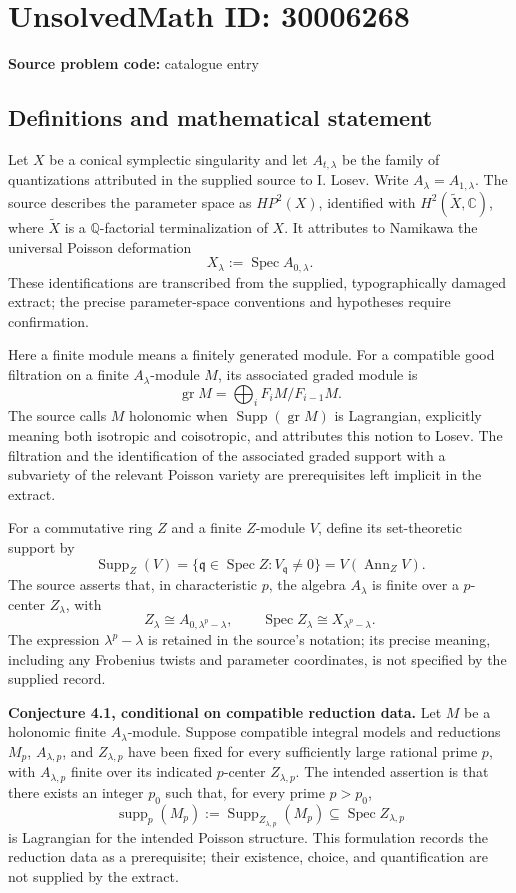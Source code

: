 \documentclass[11pt]{article}
\newcommand{\Q}{\mathbb{Q}}
\newcommand{\C}{\mathbb{C}}
\begin{document}
\section*{UnsolvedMath ID: 30006268}
\textbf{Source problem code:} catalogue entry
\subsection{Definitions and mathematical statement}
Let \(X\) be a conical symplectic singularity and let \(A_{t,\lambda}\) be the family of quantizations attributed in the supplied source to I. Losev. Write \(A_\lambda=A_{1,\lambda}\). The source describes the parameter space as \(HP^2(X)\), identified with \(H^2(\widetilde X,\C)\), where \(\widetilde X\) is a \(\Q\)-factorial terminalization of \(X\). It attributes to Namikawa the universal Poisson deformation
\[
X_\lambda:=\operatorname{Spec}A_{0,\lambda}.
\]
These identifications are transcribed from the supplied, typographically damaged extract; the precise parameter-space conventions and hypotheses require confirmation.

Here a finite module means a finitely generated module. For a compatible good filtration on a finite \(A_\lambda\)-module \(M\), its associated graded module is
\[
\operatorname{gr}M=\bigoplus_i F_iM/F_{i-1}M.
\]
The source calls \(M\) holonomic when \(\operatorname{Supp}(\operatorname{gr}M)\) is Lagrangian, explicitly meaning both isotropic and coisotropic, and attributes this notion to Losev. The filtration and the identification of the associated graded support with a subvariety of the relevant Poisson variety are prerequisites left implicit in the extract.

For a commutative ring \(Z\) and a finite \(Z\)-module \(V\), define its set-theoretic support by
\[
\operatorname{Supp}_Z(V)
=\{\mathfrak q\in\operatorname{Spec}Z:V_{\mathfrak q}\ne0\}
=V(\operatorname{Ann}_ZV).
\]
The source asserts that, in characteristic \(p\), the algebra \(A_\lambda\) is finite over a \(p\)-center \(Z_\lambda\), with
\[
Z_\lambda\cong A_{0,\lambda^p-\lambda},
\qquad
\operatorname{Spec}Z_\lambda\cong X_{\lambda^p-\lambda}.
\]
The expression \(\lambda^p-\lambda\) is retained in the source's notation; its precise meaning, including any Frobenius twists and parameter coordinates, is not specified by the supplied record.

\textbf{Conjecture 4.1, conditional on compatible reduction data.}
Let \(M\) be a holonomic finite \(A_\lambda\)-module. Suppose compatible integral models and reductions \(M_p\), \(A_{\lambda,p}\), and \(Z_{\lambda,p}\) have been fixed for every sufficiently large rational prime \(p\), with \(A_{\lambda,p}\) finite over its indicated \(p\)-center \(Z_{\lambda,p}\). The intended assertion is that there exists an integer \(p_0\) such that, for every prime \(p>p_0\),
\[
\operatorname{supp}_p(M_p)
:=\operatorname{Supp}_{Z_{\lambda,p}}(M_p)
\subseteq\operatorname{Spec}Z_{\lambda,p}
\]
is Lagrangian for the intended Poisson structure. This formulation records the reduction data as a prerequisite; their existence, choice, and quantification are not supplied by the extract.
\end{document}
